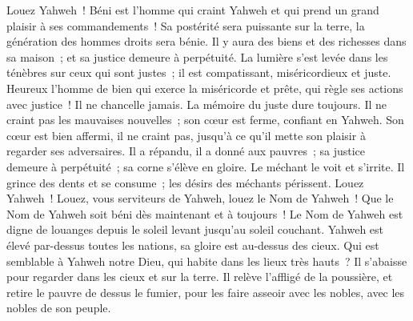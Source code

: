 \begin{multicols}{2}
\VerseOne{}Louez Yahweh~!  Béni est l'homme qui craint Yahweh  et qui prend un grand plaisir à ses commandements~!
 Sa postérité sera puissante sur la terre,  la génération des hommes droits sera bénie.
 Il y aura des biens et des richesses dans sa maison~;  et sa justice demeure à perpétuité.
 La lumière s'est levée dans les ténèbres sur ceux qui sont justes~;  il est compatissant, miséricordieux et juste.
 Heureux l'homme de bien qui exerce la miséricorde et prête,  qui règle ses actions avec justice~!
 Il ne chancelle jamais.  La mémoire du juste dure toujours.
 Il ne craint pas les mauvaises nouvelles~;  son cœur est ferme, confiant en Yahweh.
 Son cœur est bien affermi, il ne craint pas,  jusqu'à ce qu'il mette son plaisir à regarder ses adversaires.
 Il a répandu, il a donné aux pauvres~;  sa justice demeure à perpétuité~;  sa corne s'élève en gloire.
 Le méchant le voit et s'irrite.  Il grince des dents et se consume~;  les désirs des méchants périssent.
\VerseOne{}Louez Yahweh~! Louez, vous serviteurs de Yahweh, louez le Nom de Yahweh~!
Que le Nom de Yahweh soit béni dès maintenant et à toujours~!
Le Nom de Yahweh est digne de louanges depuis le soleil levant jusqu'au soleil couchant.
Yahweh est élevé par-dessus toutes les nations, sa gloire est au-dessus des cieux.
Qui est semblable à Yahweh notre Dieu, qui habite dans les lieux très hauts~?
Il s'abaisse pour regarder dans les cieux et sur la terre.
Il relève l'affligé de la poussière, et retire le pauvre de dessus le fumier,
pour les faire asseoir avec les nobles, avec les nobles de son peuple.

\end{multicols}
